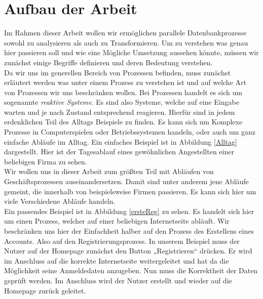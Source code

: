 \section{Aufbau der Arbeit}\label{Aufbau der Arbeit}
Im Rahmen dieser Arbeit wollen wir ermöglichen parallele Datenbankprozesse sowohl zu analysieren als auch zu Transformieren. Um zu verstehen was genau hier passieren soll und wie eine Mögliche Umsetzung aussehen könnte, müssen wir zunächst einige Begriffe definieren und deren Bedeutung verstehen.\\
Da wir uns im generellen Bereich von Prozessen befinden, muss zunächst erläutert werden was unter einem Prozess zu verstehen ist und auf welche Art von Prozessen wir uns beschränken wollen.
Bei Prozessen handelt es sich um sogenannte \textit{reaktive Systeme}. Es sind also Systeme, welche auf eine Eingabe warten und je nach Zustand entsprechend reagieren. Hierfür sind in jedem erdenklichen Teil des Alltags Beispiele zu finden. Es kann sich um Komplexe Prozesse in Computerspielen oder Betriebssystemen handeln, oder auch um ganz einfache Abläufe im Alltag. Ein einfaches Beispiel ist in Abbildung \ref{Alltag} dargestellt. Hier ist der Tagesablauf eines gewöhnlichen Angestellten einer beliebigen Firma zu sehen.\\
Wir wollen uns in dieser Arbeit zum größten Teil mit Abläufen von Geschäftsprozessen auseinandersetzen. Damit sind unter anderem jene Abläufe gemeint, die innerhalb von beispielsweise Firmen passieren. Es kann sich hier um viele Verschiedene Abläufe handeln.\\
Ein passendes Beispiel ist in Abbildung \ref{ersteReg} zu sehen. Es handelt sich hier um einen Prozess, welcher auf einer beliebigen Internetseite abläuft. Wir beschränken uns hier der Einfachheit halber auf den Prozess des Erstellens eines Accounts. Also auf den Registrierungsprozess. In unserem Beispiel muss der Nutzer auf der Homepage zunächst den Button „Registrieren“ drücken. Er wird im Anschluss auf die korrekte Internetseite weitergeleitet und hat da die Möglichkeit seine Anmeldedaten anzugeben. Nun muss die Korrektheit der Daten geprüft werden. Im Anschluss wird der Nutzer erstellt und wieder auf die Homepage zurück geleitet.\\
